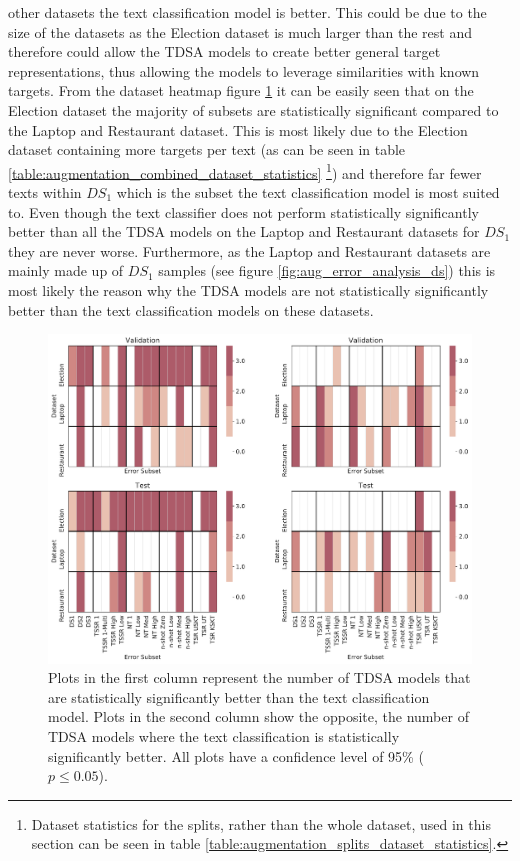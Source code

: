 other datasets the text classification model is better. This could be due to the size of the datasets as the Election dataset is much larger than the rest and therefore could allow the TDSA models to create better general target representations, thus allowing the models to leverage similarities with known targets. From the dataset heatmap figure \ref{fig:aug_baseline_dataset_error_subset_heatmap} it can be easily seen that on the Election dataset the majority of subsets are statistically significant compared to the Laptop and Restaurant dataset. This is most likely due to the Election dataset containing more targets per text (as can be seen in table \ref{table:augmentation_combined_dataset_statistics} \footnote{Dataset statistics for the splits, rather than the whole dataset, used in this section can be seen in table \ref{table:augmentation_splits_dataset_statistics}.}) and therefore far fewer texts within $DS_1$ which is the subset the text classification model is most suited to. Even though the text classifier does not perform  statistically significantly better than all the TDSA models on the Laptop and Restaurant datasets for $DS_1$ they are never worse. Furthermore, as the Laptop and Restaurant datasets are mainly made up of $DS_1$ samples (see figure \ref{fig:aug_error_analysis_ds}) this is most likely the reason why the TDSA models are not statistically significantly better than the text classification models on these datasets.



\begin{figure}[ht!]
    \centering
    \includegraphics[scale=0.45]{images/augmentation/methods_performance/baseline/baseline_dataset_error_subset_heatmap.pdf}
    \caption{Plots in the first column represent the number of TDSA models that are statistically significantly better than the text classification model. Plots in the second column show the opposite, the number of TDSA models where the text classification is statistically significantly better. All plots have a confidence level of 95\% ($p \leq 0.05$).}
    \label{fig:aug_baseline_dataset_error_subset_heatmap}
\end{figure}

